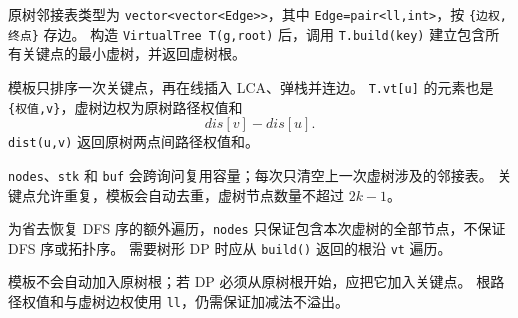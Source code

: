 原树邻接表类型为 \texttt{vector<vector<Edge>>}，其中
\texttt{Edge=pair<ll,int>}，按 \texttt{\{边权,终点\}} 存边。
构造 \texttt{VirtualTree T(g,root)} 后，调用 \texttt{T.build(key)} 建立包含所有关键点的最小虚树，并返回虚树根。

模板只排序一次关键点，再在线插入 LCA、弹栈并连边。
\texttt{T.vt[u]} 的元素也是 \texttt{\{权值,v\}}，虚树边权为原树路径权值和
\[
  dis[v]-dis[u].
\]
\texttt{dist(u,v)} 返回原树两点间路径权值和。

\begin{icpcresult}[多次构建]
  \texttt{nodes}、\texttt{stk} 和 \texttt{buf} 会跨询问复用容量；每次只清空上一次虚树涉及的邻接表。
  关键点允许重复，模板会自动去重，虚树节点数量不超过 $2k-1$。
\end{icpcresult}

\begin{icpcwarning}[nodes 顺序]
  为省去恢复 DFS 序的额外遍历，\texttt{nodes} 只保证包含本次虚树的全部节点，不保证 DFS 序或拓扑序。
  需要树形 DP 时应从 \texttt{build()} 返回的根沿 \texttt{vt} 遍历。
\end{icpcwarning}

\begin{icpcwarning}[根与数值范围]
  模板不会自动加入原树根；若 DP 必须从原树根开始，应把它加入关键点。
  根路径权值和与虚树边权使用 \texttt{ll}，仍需保证加减法不溢出。
\end{icpcwarning}
